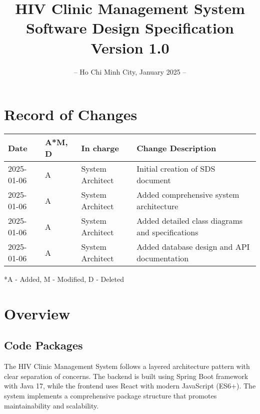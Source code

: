\documentclass[12pt,a4paper]{article}
\title{
    \vspace{-2cm}
    \Huge\textbf{HIV Clinic Management System}\\
    \vspace{1cm}
    \Large\textbf{Software Design Specification}\\
    \vspace{2cm}
    \normalsize Version 1.0
}
\author{}
\date{
    \vspace{4cm}
    – Ho Chi Minh City, January 2025 –
}
\begin{document}
\maketitle
\thispagestyle{empty}

\newpage

\section*{Record of Changes}
\begin{longtable}{|p{3cm}|p{2cm}|p{3cm}|p{6cm}|}
\hline
\textbf{Date} & \textbf{A*M, D} & \textbf{In charge} & \textbf{Change Description} \\
\hline
2025-01-06 & A & System Architect & Initial creation of SDS document \\
\hline
2025-01-06 & A & System Architect & Added comprehensive system architecture \\
\hline
2025-01-06 & A & System Architect & Added detailed class diagrams and specifications \\
\hline
2025-01-06 & A & System Architect & Added database design and API documentation \\
\hline
\end{longtable}

\footnotesize{*A - Added, M - Modified, D - Deleted}

\newpage

\tableofcontents

\newpage

\section{Overview}

\subsection{Code Packages}

The HIV Clinic Management System follows a layered architecture pattern with clear separation of concerns. The backend is built using Spring Boot framework with Java 17, while the frontend uses React with modern JavaScript (ES6+). The system implements a comprehensive package structure that promotes maintainability and scalability.
\end{document}

